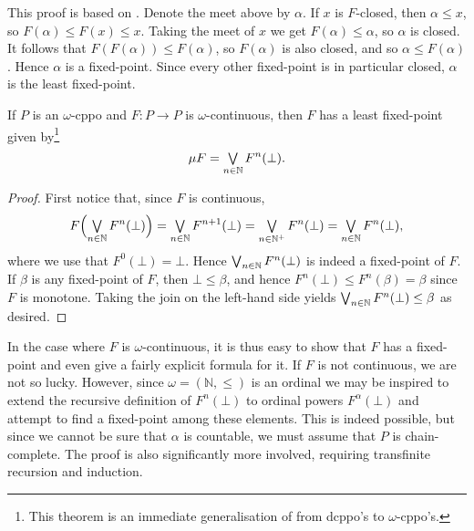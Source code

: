 \documentclass[a4paper, 11pt, article, danish, oneside]{memoir}
\newcommand{\naturals}{\mathbb{N}}
\DeclareMathOperator*{\smallbigvee}{\textstyle\bigvee}
\DeclareMathOperator*{\bigjoin}{\mathchoice
    {\smallbigvee}%
    {\bigvee}%
    {\bigvee}%
    {\bigvee}%
}
\begin{document}
\begin{prooffootnote}{This proof is based on \textcite[Theorem~2.35]{davey-priestley-order}.}
    Denote the meet above by $\alpha$. If $x$ is $F$-closed, then $\alpha \leq x$, so $F(\alpha) \leq F(x) \leq x$. Taking the meet of $x$ we get $F(\alpha) \leq \alpha$, so $\alpha$ is closed. It follows that $F(F(\alpha)) \leq F(\alpha)$, so $F(\alpha)$ is also closed, and so $\alpha \leq F(\alpha)$. Hence $\alpha$ is a fixed-point. Since every other fixed-point is in particular closed, $\alpha$ is the least fixed-point.
\end{prooffootnote}


\begin{theorem}
    If $P$ is an $\omega$-cppo and $F \colon P \to P$ is $\omega$-continuous, then $F$ has a least fixed-point given by\footnote{This theorem is an immediate generalisation of \textcite[Theorem~8.15]{davey-priestley-order} from dcppo's to $\omega$-cppo's.}
    \begin{equation*}
        \mu F
            = \bigjoin_{n \in \naturals} F^n(\bot).
    \end{equation*}
\end{theorem}

\begin{proof}
    First notice that, since $F$ is continuous,
    \begin{equation*}
        F \Bigl( \bigjoin_{n \in \naturals} F^n(\bot) \Bigr)
            = \bigjoin_{n \in \naturals} F^{n+1}(\bot)
            = \bigjoin_{n \in \naturals^+} F^n(\bot)
            = \bigjoin_{n \in \naturals} F^n(\bot),
    \end{equation*}
    where we use that $F^0(\bot) = \bot$. Hence $\bigjoin_{n \in \naturals} F^n(\bot)$ is indeed a fixed-point of $F$. If $\beta$ is any fixed-point of $F$, then $\bot \leq \beta$, and hence $F^n(\bot) \leq F^n(\beta) = \beta$ since $F$ is monotone. Taking the join on the left-hand side yields $\bigjoin_{n \in \naturals} F^n(\bot) \leq \beta$ as desired.
\end{proof}
%
In the case where $F$ is $\omega$-continuous, it is thus easy to show that $F$ has a fixed-point and even give a fairly explicit formula for it. If $F$ is not continuous, we are not so lucky. However, since $\omega = (\naturals,\leq)$ is an ordinal we may be inspired to extend the recursive definition of $F^n(\bot)$ to ordinal powers $F^\alpha(\bot)$ and attempt to find a fixed-point among these elements. This is indeed possible, but since we cannot be sure that $\alpha$ is countable, we must assume that $P$ is chain-complete. The proof is also significantly more involved, requiring transfinite recursion and induction.
\end{document}
